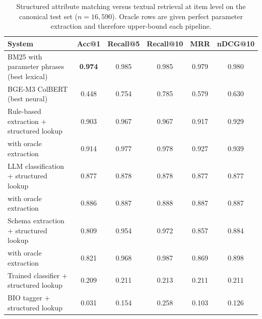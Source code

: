 \begin{table}[ht]
\centering
\caption{Structured attribute matching versus textual retrieval at item level on the canonical test set ($n=16{,}590$). Oracle rows are given perfect parameter extraction and therefore upper-bound each pipeline.}
\label{tab:structured_baselines}
\begin{tabular}{lccccc}
\toprule
\textbf{System} & \textbf{Acc@1} & \textbf{Recall@5} & \textbf{Recall@10} & \textbf{MRR} & \textbf{nDCG@10} \\
\midrule
BM25 with parameter phrases (best lexical) & \textbf{0.974} & 0.985 & 0.985 & 0.979 & 0.980 \\
BGE-M3 ColBERT (best neural) & 0.448 & 0.754 & 0.785 & 0.579 & 0.630 \\
Rule-based extraction + structured lookup & 0.903 & 0.967 & 0.967 & 0.917 & 0.929 \\
\quad with oracle extraction & 0.914 & 0.977 & 0.978 & 0.927 & 0.939 \\
LLM classification + structured lookup & 0.877 & 0.878 & 0.878 & 0.877 & 0.877 \\
\quad with oracle extraction & 0.886 & 0.887 & 0.888 & 0.887 & 0.887 \\
Schema extraction + structured lookup & 0.809 & 0.954 & 0.972 & 0.857 & 0.884 \\
\quad with oracle extraction & 0.821 & 0.968 & 0.987 & 0.869 & 0.898 \\
Trained classifier + structured lookup & 0.209 & 0.211 & 0.213 & 0.211 & 0.211 \\
BIO tagger + structured lookup & 0.031 & 0.154 & 0.258 & 0.103 & 0.126 \\
\bottomrule
\end{tabular}
\end{table}
